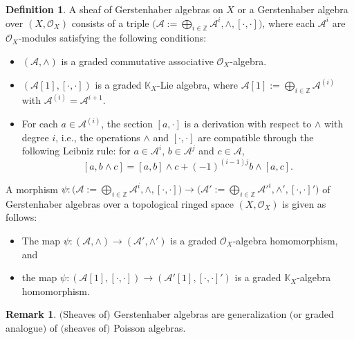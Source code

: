 \documentclass[pdftex]{sigma}
\numberwithin{equation}{section}
\theoremstyle{definition}
\newtheorem{Def}[Thm]{Definition}
\newtheorem{Rem}[Thm]{Remark}
\begin{document}
\begin{Def} \label{sheaf of G-algs and morphisms} A sheaf of Gerstenhaber algebras on $X$ or a Gerstenhaber algebra over $(X,\mathcal{O}_X)$ consists of a triple $\bigl(\mathcal{A}:=\bigoplus_{i \in \mathbb{Z}} \mathcal{A}^i, \wedge, [\cdot, \cdot]\bigr)$, where each $\mathcal{A}^i$ are $\mathcal{O}_X$-modules satisfying the following conditions:
	\begin{itemize}\itemsep=0pt
		\item $(\mathcal{A}, \wedge)$ is a graded commutative associative $\mathcal{O}_X$-algebra.
		\item $(\mathcal{A}[1], [\cdot,\cdot])$ is a graded $\mathbb{K}_X$-Lie algebra, where $\mathcal{A}[1]:=\bigoplus_{i \in\mathbb{Z}} \mathcal{A}^{(i)}$ with $\mathcal{A}^{(i)}=\mathcal{A}^{i+1}$.
		\item For each $a \in \mathcal{A}^{(i)}$, the section $[a,\cdot]$ is a derivation with respect to $\wedge$ with degree $i$, i.e.,
		the operations $\wedge$ and $[\cdot,\cdot]$ are compatible through the following Leibniz rule: for $a\in \mathcal{A}^i$, $b\in \mathcal{A}^j$ and $c\in \mathcal{A}$,
\[
[a, b \wedge c]=[a,b] \wedge c + (-1)^{(i-1)j}b \wedge [a,c].
\]
\end{itemize}
	
	A morphism $\psi\colon \bigl(\mathcal{A}:=\bigoplus_{i \in \mathbb{Z}} \mathcal{A}^i, \wedge, [\cdot, \cdot]\bigr) \rightarrow \bigl(\mathcal{A}':=\bigoplus_{i \in \mathbb{Z}} \mathcal{A'}^i, \wedge', [\cdot, \cdot]'\bigr)$ of Gerstenhaber algebras over a topological ringed space $(X, \mathcal{O}_X)$ is given as follows:
	\begin{itemize}\itemsep=0pt
		\item The map $\psi\colon (\mathcal{A}, \wedge) \rightarrow (\mathcal{A}', \wedge')$ is a graded $\mathcal{O}_X$-algebra homomorphism, and
		\item the map $\psi\colon (\mathcal{A}[1], [\cdot, \cdot]) \rightarrow (\mathcal{A}'[1], [\cdot, \cdot]')$ is a graded $\mathbb{K}_X$-algebra homomorphism.
	\end{itemize}
\end{Def}

\begin{Rem}
$($Sheaves of$)$ Gerstenhaber algebras are generalization $($or graded analogue$)$ of $($sheaves of$)$ Poisson algebras.
\end{Rem}
\end{document}
